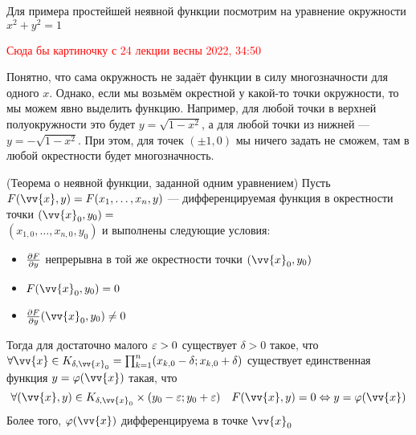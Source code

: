 \begin{example}
	Для примера простейшей неявной функции посмотрим на уравнение окружности $x^2 + y^2 = 1$
	
	\textcolor{red}{Сюда бы картиночку с 24 лекции весны 2022, 34:50}
	
	Понятно, что сама окружность не задаёт функции в силу многозначности для одного $x$. Однако, если мы возьмём окрестной у какой-то точки окружности, то мы можем явно выделить функцию. Например, для любой точки в верхней полуокружности это будет $y = \sqrt{1 - x^2}$, а для любой точки из нижней --- $y = -\sqrt{1 - x^2}$. При этом, для точек $(\pm 1, 0)$ мы ничего задать не сможем, там в любой окрестности будет многозначность.
\end{example}

\begin{theorem} (Теорема о неявной функции, заданной одним уравнением)
	Пусть $F(\vv{x}, y) = F(x_1, \ldots, x_n, y)$ --- дифференцируемая функция в окрестности точки $(\vv{x}_0, y_0) =$ \\ $(x_{1, 0}, \ldots, x_{n, 0}, y_0)$ и выполнены следующие условия:
	\begin{itemize}
		\item $\frac{\partial F}{\partial y}$ непрерывна в той же окрестности точки $(\vv{x}_0, y_0)$
		
		\item $F(\vv{x}_0, y_0) = 0$
		
		\item $\pd{F}{y}(\vv{x}_0, y_0) \neq 0$
	\end{itemize}
	Тогда для достаточно малого $\varepsilon > 0$ существует $\delta > 0$ такое, что $\forall \vv{x} \in K_{\delta, \vv{x}_0} = \prod_{k = 1}^n (x_{k, 0} - \delta; x_{k, 0} + \delta)$ существует единственная функция $y = \phi(\vv{x})$ такая, что
	\[
		\forall (\vv{x}, y) \in K_{\delta, \vv{x}_0} \times (y_0 - \eps; y_0 + \eps) \quad F(\vv{x}, y) = 0 \Lra y = \phi(\vv{x})
	\]
	Более того, $\phi(\vv{x})$ дифференцируема в точке $\vv{x}_0$
\end{theorem}

